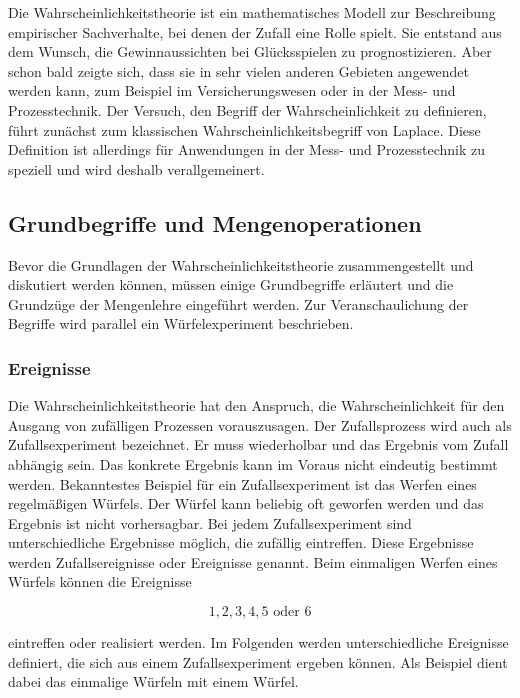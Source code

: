 \noindent Die Wahrscheinlichkeitstheorie ist ein mathematisches Modell zur Beschreibung empirischer Sachverhalte, bei denen der Zufall eine Rolle spielt. Sie entstand aus dem Wunsch, die Gewinnaussichten bei Gl\"{u}cksspielen zu prognostizieren. Aber schon bald zeigte sich, dass sie in sehr vielen anderen Gebieten angewendet werden kann, zum Beispiel im Versicherungswesen oder in der Mess- und Prozesstechnik. Der Versuch, den Begriff der Wahrscheinlichkeit zu definieren, f\"{u}hrt zun\"{a}chst zum klassischen Wahrscheinlichkeitsbegriff von Laplace. Diese Definition ist allerdings f\"{u}r Anwendungen in der Mess- und Prozesstechnik zu speziell und wird deshalb verallgemeinert.
\subsection{Grundbegriffe und Mengenoperationen}
\noindent Bevor die Grundlagen der Wahrscheinlichkeitstheorie zusammengestellt und diskutiert werden k\"{o}nnen, m\"{u}ssen einige Grundbegriffe erl\"{a}utert und die Grundz\"{u}ge der Mengenlehre eingef\"{u}hrt werden. Zur Veranschaulichung der Begriffe wird parallel ein W\"{u}rfelexperiment beschrieben.
\subsubsection{Ereignisse}
\noindent Die Wahrscheinlichkeitstheorie hat den Anspruch, die Wahrscheinlichkeit f\"{u}r den Ausgang von zuf\"{a}lligen Prozessen vorauszusagen. Der Zufallsprozess wird auch als Zufallsexperiment bezeichnet. Er muss wiederholbar und das Ergebnis vom Zufall abh\"{a}ngig sein. Das konkrete Ergebnis kann im Voraus nicht eindeutig bestimmt werden.\newline
\noindent Bekanntestes Beispiel f\"{u}r ein Zufallsexperiment ist das Werfen eines regelm\"{a}{\ss}igen W\"{u}rfels. Der W\"{u}rfel kann beliebig oft geworfen werden und das Ergebnis ist nicht vorhersagbar. Bei jedem Zufallsexperiment sind unterschiedliche Ergebnisse m\"{o}glich, die zuf\"{a}llig eintreffen. Diese Ergebnisse werden Zufallsereignisse oder Ereignisse genannt. Beim einmaligen Werfen eines W\"{u}rfels k\"{o}nnen die Ereignisse

\begin{equation}\label{eq:twoone}
1, 2, 3, 4, 5 \text{ oder } 6
\end{equation}

\noindent eintreffen oder realisiert werden. Im Folgenden werden unterschiedliche Ereignisse definiert, die sich aus einem Zufallsexperiment ergeben k\"{o}nnen. Als Beispiel dient dabei das einmalige W\"{u}rfeln mit einem W\"{u}rfel.\bigskip


